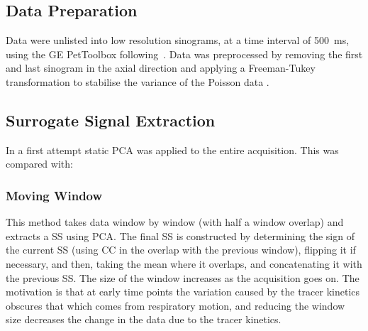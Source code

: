     \subsection{Data Preparation} \label{sec:data_preparation}
        Data were unlisted into low resolution sinograms, at a time interval of \SI{500}{\milli\second}, using the \gls{GE} PetToolbox following~\cite{Bertolli2018Data-DrivenTomography}. Data was preprocessed by removing the first and last sinogram in the axial direction and applying a Freeman-Tukey transformation to stabilise the variance of the Poisson data \cite{Freeman1950TransformationsRoot}. %
        
    \vspace{-0.5cm}
    
    \subsection{Surrogate Signal Extraction} \label{sec:surrogate_signal_extraction}
        In a first attempt static \gls{PCA} was applied to the entire acquisition. This was compared with:
        
        \subsubsection{Moving Window} \label{sec:moving_window}
            This method takes data window by window (with half a window overlap) and extracts a \gls{SS} using \gls{PCA}. The final \gls{SS} is constructed by determining the sign of the current \gls{SS} (using \gls{CC} in the overlap with the previous window), flipping it if necessary, and then, taking the mean where it overlaps, and concatenating it with the previous \gls{SS}. The size of the window increases as the acquisition goes on. The motivation is that at early time points the variation caused by the tracer kinetics obscures that which comes from respiratory motion, and reducing the window size decreases the change in the data due to the tracer kinetics.
        
